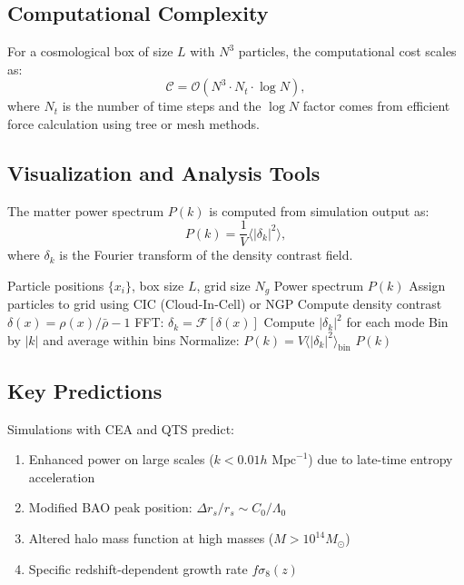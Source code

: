 \subsection{Computational Complexity}

\begin{theorem}
For a cosmological box of size $L$ with $N^3$ particles, the computational cost scales as:
\[
\mathcal{C} = \mathcal{O}(N^3 \cdot N_t \cdot \log N),
\]
where $N_t$ is the number of time steps and the $\log N$ factor comes from efficient force calculation using tree or mesh methods.
\end{theorem}

\subsection{Visualization and Analysis Tools}

\begin{lemma}
The matter power spectrum $P(k)$ is computed from simulation output as:
\[
P(k) = \frac{1}{V}\langle |\delta_k|^2 \rangle,
\]
where $\delta_k$ is the Fourier transform of the density contrast field.
\end{lemma}

\begin{algorithm}[H]
\caption{Power Spectrum Estimation}
\begin{algorithmic}[1]
\REQUIRE Particle positions $\{x_i\}$, box size $L$, grid size $N_g$
\ENSURE Power spectrum $P(k)$
\STATE Assign particles to grid using CIC (Cloud-In-Cell) or NGP
\STATE Compute density contrast $\delta(x) = \rho(x)/\bar{\rho} - 1$
\STATE FFT: $\delta_k = \mathcal{F}[\delta(x)]$
\STATE Compute $|\delta_k|^2$ for each mode
\STATE Bin by $|k|$ and average within bins
\STATE Normalize: $P(k) = V \langle |\delta_k|^2 \rangle_{\text{bin}}$
\RETURN $P(k)$
\end{algorithmic}
\end{algorithm}

\subsection{Key Predictions}

\begin{theorem}
Simulations with CEA and QTS predict:
\begin{enumerate}
\item Enhanced power on large scales ($k < 0.01 h \text{ Mpc}^{-1}$) due to late-time entropy acceleration
\item Modified BAO peak position: $\Delta r_s / r_s \sim C_0/\Lambda_0$
\item Altered halo mass function at high masses ($M > 10^{14} M_\odot$)
\item Specific redshift-dependent growth rate $f\sigma_8(z)$
\end{enumerate}
\end{theorem}

